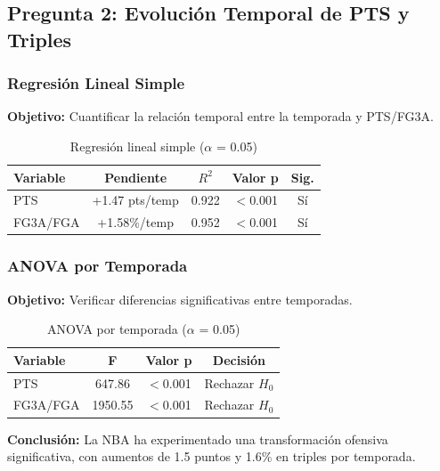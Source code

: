 \subsection{Pregunta 2: Evolución Temporal de PTS y Triples}

\subsubsection{Regresión Lineal Simple}

\textbf{Objetivo:} Cuantificar la relación temporal entre la temporada y PTS/FG3A.

\begin{table}[H]
\centering
\begin{tabular}{|l|c|c|c|c|}
\hline
\textbf{Variable} & \textbf{Pendiente} & \textbf{$R^2$} & \textbf{Valor p} & \textbf{Sig.} \\
\hline
PTS & +1.47 pts/temp & 0.922 & $<$0.001 & Sí \\
FG3A/FGA & +1.58\%/temp & 0.952 & $<$0.001 & Sí \\
\hline
\end{tabular}
\caption{Regresión lineal simple ($\alpha$ = 0.05)}
\end{table}

\subsubsection{ANOVA por Temporada}

\textbf{Objetivo:} Verificar diferencias significativas entre temporadas.

\begin{table}[H]
\centering
\begin{tabular}{|l|c|c|c|}
\hline
\textbf{Variable} & \textbf{F} & \textbf{Valor p} & \textbf{Decisión} \\
\hline
PTS & 647.86 & $<$0.001 & Rechazar $H_0$ \\
FG3A/FGA & 1950.55 & $<$0.001 & Rechazar $H_0$ \\
\hline
\end{tabular}
\caption{ANOVA por temporada ($\alpha$ = 0.05)}
\end{table}

\textbf{Conclusión:} La NBA ha experimentado una transformación ofensiva significativa, con aumentos de 1.5 puntos y 1.6\% en triples por temporada.
